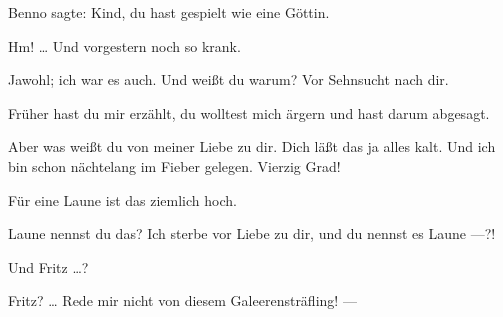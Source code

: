 \documentclass[
	final,
	a4paper,
	ngerman,
	mpinclude = true, %
	twoside = true,
	open = right,
	cleardoublepage = plain,
	DIV = 13,
	BCOR = 1cm,
	titlepage = firstiscover,
	]{scrbook}
\newcommand{\thecharacter}[1]{\textup{\textsc{#1}}\xspace}
\newcommand{\thedichter}{\thecharacter{Dichter}}
\newcommand{\theschauspielerin}{\thecharacter{Schauspielerin}}
\newcommand{\character}[1]{\item[#1:]}
\newcommand{\dichter}{\character{\thedichter}}
\newcommand{\schauspielerin}{\character{\theschauspielerin}}
\begin{document}
\begin{play}
	\schauspielerin
	Benno sagte: Kind, du hast gespielt wie eine Göttin.

	\dichter
	Hm! \ldots{} Und vorgestern noch so krank.

	\schauspielerin
	Jawohl; ich war es auch. Und weißt du warum? Vor Sehnsucht nach dir.

	\dichter
	Früher hast du mir erzählt, du wolltest mich ärgern und hast darum abgesagt.

	\schauspielerin
	Aber was weißt du von meiner Liebe zu dir. Dich läßt das ja alles kalt. Und ich bin schon nächtelang im Fieber gelegen. Vierzig Grad!

	\dichter
	Für eine Laune ist das ziemlich hoch.

	\schauspielerin
	Laune nennst du das? Ich sterbe vor Liebe zu dir, und du nennst es Laune ---?!

	\dichter
	Und Fritz \ldots{}?

	\schauspielerin
	Fritz? \ldots{} Rede mir nicht von diesem Galeerensträfling! ---

\end{play}
\end{document}
